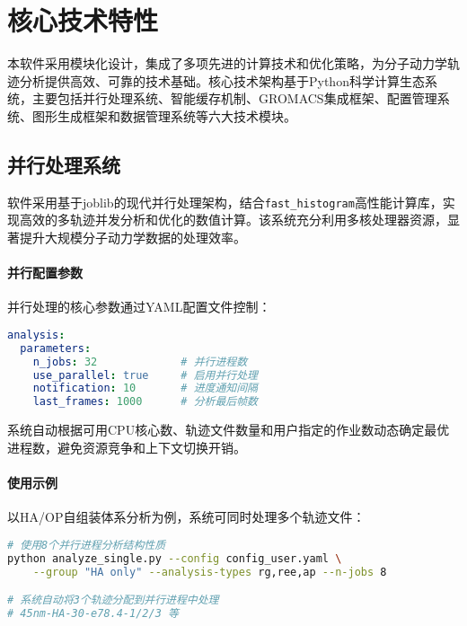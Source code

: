 
\section{核心技术特性}
\label{sec:core_features}

本软件采用模块化设计，集成了多项先进的计算技术和优化策略，为分子动力学轨迹分析提供高效、可靠的技术基础。核心技术架构基于Python科学计算生态系统，主要包括并行处理系统、智能缓存机制、GROMACS集成框架、配置管理系统、图形生成框架和数据管理系统等六大技术模块。

\subsection{并行处理系统}
\label{subsec:parallel_processing}

软件采用基于joblib的现代并行处理架构，结合\lstinline|fast_histogram|高性能计算库，实现高效的多轨迹并发分析和优化的数值计算。该系统充分利用多核处理器资源，显著提升大规模分子动力学数据的处理效率。

\paragraph{并行配置参数}

并行处理的核心参数通过YAML配置文件控制：

\begin{lstlisting}[language=yaml,style=blockstyle]
analysis:
  parameters:
    n_jobs: 32             # 并行进程数
    use_parallel: true     # 启用并行处理
    notification: 10       # 进度通知间隔
    last_frames: 1000      # 分析最后帧数
\end{lstlisting}

系统自动根据可用CPU核心数、轨迹文件数量和用户指定的作业数动态确定最优进程数，避免资源竞争和上下文切换开销。

\paragraph{使用示例}

以HA/OP自组装体系分析为例，系统可同时处理多个轨迹文件：

\begin{lstlisting}[language=bash,style=blockstyle]
# 使用8个并行进程分析结构性质
python analyze_single.py --config config_user.yaml \
    --group "HA only" --analysis-types rg,ree,ap --n-jobs 8

# 系统自动将3个轨迹分配到并行进程中处理
# 45nm-HA-30-e78.4-1/2/3 等
\end{lstlisting}

